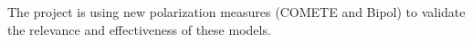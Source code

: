 \documentclass[preview]{standalone}
\begin{document}
The project is using new polarization measures (COMETE and Bipol) to validate the relevance and effectiveness of these models.\\
\end{document}
